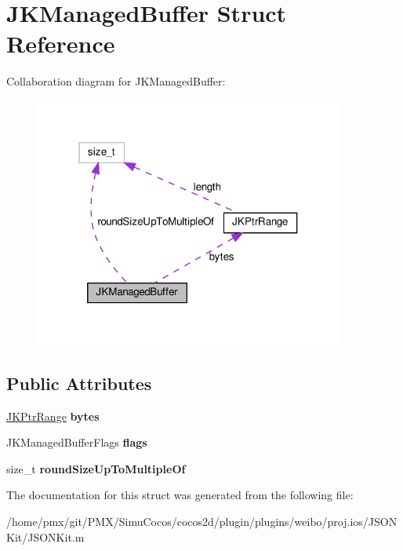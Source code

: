 \hypertarget{structJKManagedBuffer}{}\section{J\+K\+Managed\+Buffer Struct Reference}
\label{structJKManagedBuffer}


Collaboration diagram for J\+K\+Managed\+Buffer\+:
\nopagebreak
\begin{figure}[H]
\begin{center}
\leavevmode
\includegraphics[width=289pt]{structJKManagedBuffer__coll__graph}
\end{center}
\end{figure}
\subsection*{Public Attributes}
\begin{DoxyCompactItemize}
\item 
\mbox{\label{structJKManagedBuffer_a57af888785f75f4282fe68215655e146}} 
\hyperlink{structJKPtrRange}{J\+K\+Ptr\+Range} {\bfseries bytes}
\item 
\mbox{\label{structJKManagedBuffer_a38a499c041d11c99bc175f53c3700c5a}} 
J\+K\+Managed\+Buffer\+Flags {\bfseries flags}
\item 
\mbox{\label{structJKManagedBuffer_ad45389f30f38ea703e116ba4f7496fc2}} 
size\+\_\+t {\bfseries round\+Size\+Up\+To\+Multiple\+Of}
\end{DoxyCompactItemize}


The documentation for this struct was generated from the following file\+:\begin{DoxyCompactItemize}
\item 
/home/pmx/git/\+P\+M\+X/\+Simu\+Cocos/cocos2d/plugin/plugins/weibo/proj.\+ios/\+J\+S\+O\+N\+Kit/J\+S\+O\+N\+Kit.\+m\end{DoxyCompactItemize}
